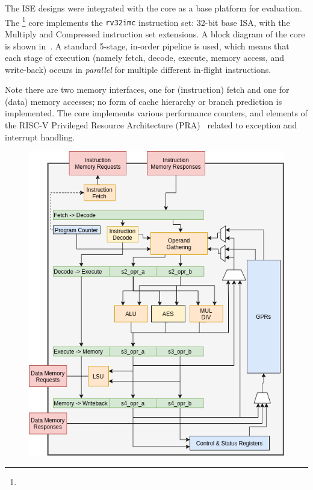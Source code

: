 

The ISE designs were integrated with the  core as a base platform
for evaluation.
The \footnote{%
} core
implements the {\tt rv32imc} instruction set: 32-bit base ISA, with the
Multiply and Compressed instruction set extensions.
A block diagram of the core is shown in~.
A standard 5-stage, in-order pipeline is used, which
means that each stage of execution
(namely fetch, decode, execute, memory access, and write-back)
occurs in {\em parallel} for multiple different in-flight instructions.

Note there are two memory interfaces, one for (instruction) fetch and one for
(data) memory accesses;
no form of cache hierarchy or branch prediction is implemented.
The core implements various performance counters,
and
elements of the
RISC-V Privileged Resource Architecture (PRA)~\cite[Chapter 3]{RV:ISA:II:17}
related to exception and interrupt handling.


\begin{figure}
\centering
\includegraphics[scale=0.5,angle=90]{diagrams/scarv-cpu-uarch.png}
\label{fig:design:cpu_block:2}
\end{figure}
